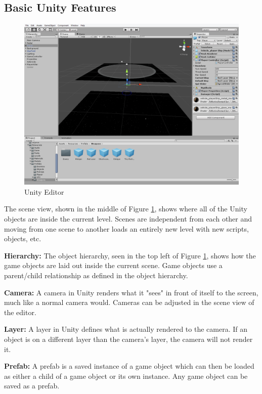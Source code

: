 \documentclass[12pt]{article}       %
\def\hs{\hspace{15pt}}
\begin{document}
\subsection{Basic Unity Features} %
\begin{figure} [H]
\centering
\includegraphics[width=7in]{scene.png}
\caption{Unity Editor} \label{Unity}
\end{figure}

\hs {\bf Scene:} The scene view, shown in the middle of Figure \ref{Unity}, shows where all of the Unity objects are inside the current level. Scenes are independent from each other and moving from one scene to another loads an entirely new level with new scripts, objects, etc.

{\bf Hierarchy:} The object hierarchy, seen in the top left of Figure \ref{Unity}, shows how the game objects are laid out inside the current scene. Game objects use a parent/child relationship as defined in the object hierarchy.

{\bf Camera:} A camera in Unity renders what it "sees" in front of itself to the screen, much like a normal camera would. Cameras can be adjusted in the scene view of the editor.

{\bf Layer:} A layer in Unity defines what is actually rendered to the camera. If an object is on a different layer than the camera's layer, the camera will not render it.

{\bf Prefab:} A prefab is a saved instance of a game object which can then be loaded as either a child of a game object or its own instance. Any game object can be saved as a prefab.
\end{document}
